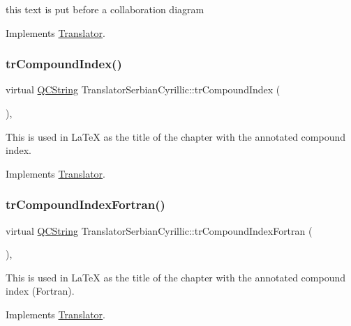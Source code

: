 this text is put before a collaboration diagram 

Implements \mbox{\hyperlink{class_translator}{Translator}}.

\mbox{\label{class_translator_serbian_cyrillic_af375b8ce5dc36f46b98bcc9d2cf3ea42}} 
\subsubsection{\texorpdfstring{trCompoundIndex()}{trCompoundIndex()}}
{\footnotesize\ttfamily virtual \mbox{\hyperlink{class_q_c_string}{Q\+C\+String}} Translator\+Serbian\+Cyrillic\+::tr\+Compound\+Index (\begin{DoxyParamCaption}{ }\end{DoxyParamCaption})\hspace{0.3cm}{\ttfamily [inline]}, {\ttfamily [virtual]}}

This is used in La\+TeX as the title of the chapter with the annotated compound index. 

Implements \mbox{\hyperlink{class_translator}{Translator}}.

\mbox{\label{class_translator_serbian_cyrillic_a3ea8bdb8a6884a0cc1e80e9705e9146e}} 
\subsubsection{\texorpdfstring{trCompoundIndexFortran()}{trCompoundIndexFortran()}}
{\footnotesize\ttfamily virtual \mbox{\hyperlink{class_q_c_string}{Q\+C\+String}} Translator\+Serbian\+Cyrillic\+::tr\+Compound\+Index\+Fortran (\begin{DoxyParamCaption}{ }\end{DoxyParamCaption})\hspace{0.3cm}{\ttfamily [inline]}, {\ttfamily [virtual]}}

This is used in La\+TeX as the title of the chapter with the annotated compound index (Fortran). 

Implements \mbox{\hyperlink{class_translator}{Translator}}.

